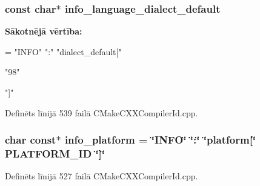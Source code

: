 \subsubsection[{\texorpdfstring{info\+\_\+language\+\_\+dialect\+\_\+default}{info_language_dialect_default}}]{\setlength{\rightskip}{0pt plus 5cm}const char$\ast$ info\+\_\+language\+\_\+dialect\+\_\+default}\hypertarget{cmake-build-debug_2_c_make_files_23_810_82_2_compiler_id_c_x_x_2_c_make_c_x_x_compiler_id_8cpp_a1ce162bad2fe6966ac8b33cc19e120b8}{}\label{cmake-build-debug_2_c_make_files_23_810_82_2_compiler_id_c_x_x_2_c_make_c_x_x_compiler_id_8cpp_a1ce162bad2fe6966ac8b33cc19e120b8}
{\bfseries Sākotnējā vērtība\+:}
\begin{DoxyCode}
= \textcolor{stringliteral}{"INFO"} \textcolor{stringliteral}{":"} \textcolor{stringliteral}{"dialect\_default["}







  \textcolor{stringliteral}{"98"}

\textcolor{stringliteral}{"]"}
\end{DoxyCode}


Definēts līnijā 539 failā C\+Make\+C\+X\+X\+Compiler\+Id.\+cpp.

\subsubsection[{\texorpdfstring{info\+\_\+platform}{info_platform}}]{\setlength{\rightskip}{0pt plus 5cm}char const$\ast$ info\+\_\+platform = \char`\"{}I\+N\+FO\char`\"{} \char`\"{}\+:\char`\"{} \char`\"{}platform\mbox{[}\char`\"{} P\+L\+A\+T\+F\+O\+R\+M\+\_\+\+ID \char`\"{}\mbox{]}\char`\"{}}\hypertarget{cmake-build-debug_2_c_make_files_23_810_82_2_compiler_id_c_x_x_2_c_make_c_x_x_compiler_id_8cpp_a2321403dee54ee23f0c2fa849c60f7d4}{}\label{cmake-build-debug_2_c_make_files_23_810_82_2_compiler_id_c_x_x_2_c_make_c_x_x_compiler_id_8cpp_a2321403dee54ee23f0c2fa849c60f7d4}


Definēts līnijā 527 failā C\+Make\+C\+X\+X\+Compiler\+Id.\+cpp.

